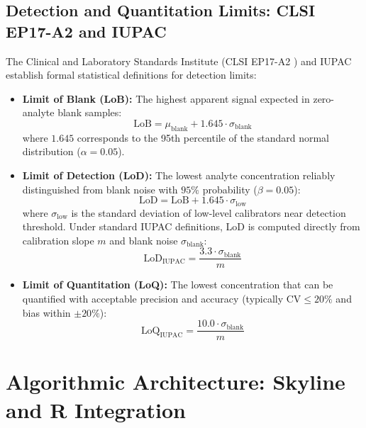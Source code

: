 \documentclass[11pt,twoside,openright]{book}
\begin{document}
\subsection{Detection and Quantitation Limits: CLSI EP17-A2 and IUPAC}
The Clinical and Laboratory Standards Institute (CLSI EP17-A2 \cite{clsi2012ep17}) and IUPAC \cite{currie1968limits} establish formal statistical definitions for detection limits:
\begin{itemize}
    \item \textbf{Limit of Blank (LoB):} The highest apparent signal expected in zero-analyte blank samples:
    \begin{equation}
    \text{LoB} = \mu_{\text{blank}} + 1.645 \cdot \sigma_{\text{blank}}
    \label{eq:lob}
    \end{equation}
    where $1.645$ corresponds to the 95th percentile of the standard normal distribution ($\alpha = 0.05$).
    \item \textbf{Limit of Detection (LoD):} The lowest analyte concentration reliably distinguished from blank noise with $95\%$ probability ($\beta = 0.05$):
    \begin{equation}
    \text{LoD} = \text{LoB} + 1.645 \cdot \sigma_{\text{low}}
    \label{eq:lod}
    \end{equation}
    where $\sigma_{\text{low}}$ is the standard deviation of low-level calibrators near detection threshold.
    Under standard IUPAC definitions, LoD is computed directly from calibration slope $m$ and blank noise $\sigma_{\text{blank}}$:
    \begin{equation}
    \text{LoD}_{\text{IUPAC}} = \frac{3.3 \cdot \sigma_{\text{blank}}}{m}
    \label{eq:lod_iupac}
    \end{equation}
    \item \textbf{Limit of Quantitation (LoQ):} The lowest concentration that can be quantified with acceptable precision and accuracy (typically $\text{CV} \le 20\%$ and bias within $\pm 20\%$):
    \begin{equation}
    \text{LoQ}_{\text{IUPAC}} = \frac{10.0 \cdot \sigma_{\text{blank}}}{m}
    \label{eq:loq_iupac}
    \end{equation}
\end{itemize}

\section{Algorithmic Architecture: Skyline and R Integration}
\end{document}
